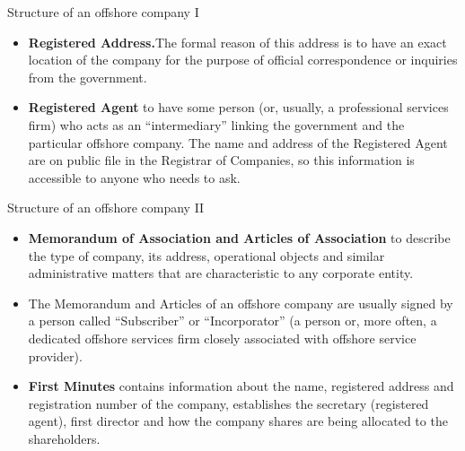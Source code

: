\documentclass[international_finance_p2.tex]{subfiles}
\begin{document}
\begin{frame}{Structure of an offshore company I}
\begin{itemize}[<+->]
\item
\textbf{Registered Address.}The formal reason of this address is to have an exact location of the company for the purpose of official correspondence or inquiries from the government.
\item
\textbf{Registered Agent} to have some person (or, usually, a professional services firm) who acts as an ``intermediary'' linking the government and the particular offshore company. The name and address of the Registered Agent are on public file in the Registrar of Companies, so this information is accessible to anyone who needs to ask.
\end{itemize}
\end{frame}
\begin{frame}[shrink=10]{Structure of an offshore company II}
\begin{itemize}[<+->]
\item
\textbf{Memorandum of Association and Articles of Association }to describe the type of company, its address, operational objects and similar administrative matters that are characteristic to any corporate entity.
\item
The Memorandum and Articles of an offshore company are usually signed by a person called ``Subscriber'' or ``Incorporator'' (a person or, more often, a dedicated offshore services firm closely associated with offshore service provider).
\item
\textbf{First Minutes }contains  information about the name, registered address and registration number of the company, establishes the secretary (registered agent), first director and how the company shares are being allocated to the shareholders.
\end{itemize}
\end{frame}
\end{document}
